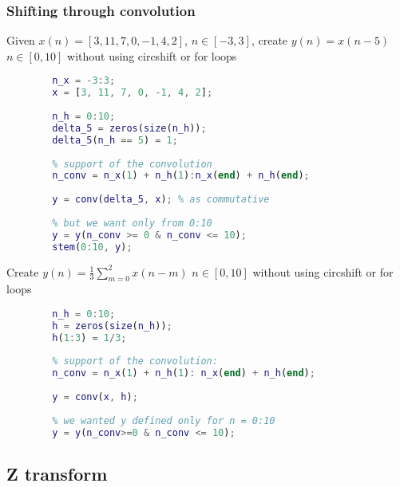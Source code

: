     \subsubsection{Shifting through convolution}
    Given $x(n)=[3,11,7,0,-1,4,2]$, $n\in[-3,3]$, create $y(n)=x(n-5)$ $n\in[0,10]$ without using circshift or for loops
    \begin{lstlisting}[language=Matlab, escapeinside=`']
        % y(n)=x(n-5)=x(n)*\delta(n-5)
        n_x = -3:3;
        x = [3, 11, 7, 0, -1, 4, 2];
        
        n_h = 0:10;
        delta_5 = zeros(size(n_h));
        delta_5(n_h == 5) = 1;
        
        % support of the convolution
        n_conv = n_x(1) + n_h(1):n_x(end) + n_h(end);
        
        y = conv(delta_5, x); % as commutative
        
        % but we want only from 0:10
        y = y(n_conv >= 0 & n_conv <= 10);
        stem(0:10, y);
    \end{lstlisting}
    Create $y(n)=\frac{1}{3}\sum_{m=0}^2x(n-m)$ $n\in[0,10]$ without using circshift or for loops
    \begin{lstlisting}[language=Matlab, escapeinside=`']
        % define the filter, which is 1/3 (delta(n) + delta(n-1) + delta(n-2))
        n_h = 0:10;
        h = zeros(size(n_h));
        h(1:3) = 1/3;
        
        % support of the convolution:
        n_conv = n_x(1) + n_h(1): n_x(end) + n_h(end);
        
        y = conv(x, h);
        
        % we wanted y defined only for n = 0:10 
        y = y(n_conv>=0 & n_conv <= 10);
    \end{lstlisting}

\pagebreak\subsection{Z transform}

